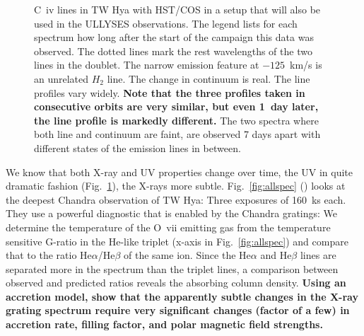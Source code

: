 \documentclass[letterpaper,11pt,twocolumn]{article}
\begin{document}
\begin{figure}
\begin{center}
\end{center}
\caption{\label{fig:UV2} C~{\sc iv} lines in TW Hya with HST/COS in a setup that will also be used in the ULLYSES observations. The legend lists for each spectrum how long after the
  start of the campaign this data was observed. The dotted lines mark the rest wavelengths of the two
  lines in the  doublet. The narrow emission feature at $-125$~km/s is
  an unrelated $H_2$ line. The change in continuum is real. The line profiles vary widely. \textbf{Note that the three
profiles taken in consecutive orbits are very similar, but even 1~day later,
the line profile is markedly different.} The two spectra where both line and
continuum are faint, are observed 7 days apart with different states of the
emission lines in between.}
\end{figure}


We know that both X-ray and UV properties change over time, the UV in
quite dramatic fashion (Fig.~\ref{fig:UV2}), the X-rays more
subtle. Fig.~\ref{fig:allspec} () looks
at the deepest Chandra observation of TW Hya: Three exposures of
160~ks each. They use a powerful diagnostic that is enabled by the
Chandra gratings: We determine the temperature of the O~{\sc vii}
emitting gas from the temperature sensitive G-ratio in the He-like
triplet (x-axis in Fig.~\ref{fig:allspec}) and compare that to the
ratio He$\alpha$/He$\beta$ of the same ion. Since the He$\alpha$ and
He$\beta$ lines are separated more in the spectrum than the triplet
lines, a comparison between observed and predicted ratios reveals the
absorbing column density. \textbf{Using an accretion model,
  \citet{2012ApJ...760L..21B} show that the apparently subtle changes
  in the X-ray grating spectrum require very significant changes
  (factor of a few) in accretion rate, filling factor, and polar
  magnetic field strengths. }
\end{document}
